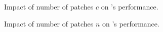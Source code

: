 \begin{figure}
\caption{Impact of number of patches $c$ on \system's performance. \label{fig:coefc}}
\end{figure}


\begin{figure}
\caption{Impact of number of patches $n$ on \system's performance. \label{fig:coefn}}
\end{figure}
